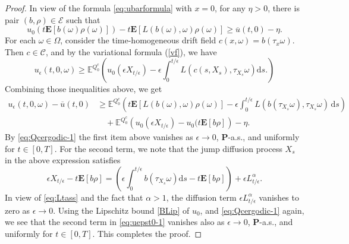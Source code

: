 \documentclass[11pt,reqno]{amsart}
\theoremstyle{definition}
\theoremstyle{remark}
\numberwithin{equation}{section}
\newcommand{\eps}{\epsilon}
\begin{document}
\begin{proof} In view of the formula \eqref{eq:ubarformula} with $x=0$, for any $\eta >0$, there is pair $(b,\rho) \in \mathscr{E}$ such that
\begin{equation}
\label{eq:uepst0-1}
u_0(t\mathbf{E}[b(\omega)\rho(\omega)]) - t\mathbf{E}[L(b(\omega),\omega)\rho(\omega)] \ge \overline{u}(t,0) -\eta. 
\end{equation}
For each $\omega \in \Omega$, consider the time-homogeneous drift field $c(x,\omega) = b(\tau_x \omega)$. Then $c\in \mathscr{C}$, and by the variational formula (\ref{vf}), we have
\begin{equation*}
    u_{\epsilon}(t,0,\omega) \geq \mathbb{E}^{Q^{c}_{0}}\left( u_{0}(\epsilon X_{t/\epsilon}) - \epsilon\int^{t/\epsilon}_0 L(c(s,X_s),\tau_{X_{s}}\omega)\mathrm{d}s. \right)
\end{equation*}
Combining those inequalities above, we get 
\begin{equation}
\label{eq:errort0-1}
\begin{aligned}
     u_\eps(t,0,\omega)-\overline{u}(t,0) &\ge \mathbb{E}^{Q^c_0}\left(t\mathbf{E}[L(b(\omega),\omega)\rho(\omega)] - \eps\int_0^{t/\eps} L(b(\tau_{X_s}\omega),\tau_{X_s}\omega)\,\mathrm{d}s\right)\\
         &\quad
      + \mathbb{E}^{Q^c_0} \left(u_0(\eps X_{t/\eps}) - u_0(t\mathbf{E}[b\rho]\right) - \eta.
     \end{aligned}
\end{equation}
By \eqref{eq:Qcergodic-1} the first item above vanishes as $\eps\to 0$, $\mathbf{P}$-a.s., and uniformly for $t\in [0,T]$. For the second term, we note that the jump diffusion process $X_s$ in the above expression satisfies
\begin{equation*}
    \epsilon X_{t/\epsilon} - t\mathbf{E}[b\rho] = \left(\eps\int^{t/\eps}_{0}b(\tau_{X_s}\omega)\mathrm{d}s - t\mathbf{E}[b\rho]\right) + \eps L^{\alpha}_{t/\eps}.
\end{equation*}
In view of \eqref{eq:Ltass} and the fact that $\alpha >1$, the diffusion term $\epsilon L^{\alpha}_{t/\epsilon}$ vanishes to zero as $\eps\to 0$. Using the Lipschitz bound \eqref{BLip} of $u_0$, and \eqref{eq:Qcergodic-1} again, we see that the second term in \eqref{eq:uepst0-1} vanishes also as $\eps\to 0$, $\mathbf{P}$-a.s., and uniformly for $t\in [0,T]$. This completes the proof.
\end{proof}
\end{document}
